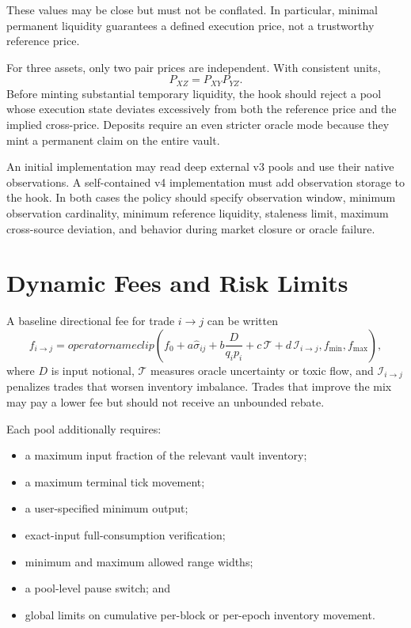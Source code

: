 \documentclass[11pt]{article}
\begin{document}
These values may be close but must not be conflated. In particular, minimal
permanent liquidity guarantees a defined execution price, not a trustworthy
reference price.

For three assets, only two pair prices are independent. With consistent units,
\begin{equation}
  P_{XZ}=P_{XY}P_{YZ}.
  \label{eq:triangle}
\end{equation}
Before minting substantial temporary liquidity, the hook should reject a pool
whose execution state deviates excessively from both the reference price and
the implied cross-price. Deposits require an even stricter oracle mode because
they mint a permanent claim on the entire vault.

An initial implementation may read deep external v3 pools and use their native
observations. A self-contained v4 implementation must add observation storage
to the hook. In both cases the policy should specify observation window,
minimum observation cardinality, minimum reference liquidity, staleness limit,
maximum cross-source deviation, and behavior during market closure or oracle
failure.

\section{Dynamic Fees and Risk Limits}

A baseline directional fee for trade $i\rightarrow j$ can be written
\begin{equation}
  f_{i\rightarrow j}=operatorname{clip}\left(
  f_0+a\widehat{\sigma}_{ij}
  +b\frac{D}{q_i p_i}
  +c\,\mathcal{T}
  +d\,\mathcal{I}_{i\rightarrow j},
  f_{\min},f_{\max}\right),
  \label{eq:fee}
\end{equation}
where $D$ is input notional, $\mathcal{T}$ measures oracle uncertainty or toxic
flow, and $\mathcal{I}_{i\rightarrow j}$ penalizes trades that worsen inventory
imbalance. Trades that improve the mix may pay a lower fee but should not
receive an unbounded rebate.

Each pool additionally requires:

\begin{itemize}
  \item a maximum input fraction of the relevant vault inventory;
  \item a maximum terminal tick movement;
  \item a user-specified minimum output;
  \item exact-input full-consumption verification;
  \item minimum and maximum allowed range widths;
  \item a pool-level pause switch; and
  \item global limits on cumulative per-block or per-epoch inventory movement.
\end{itemize}
\end{document}
